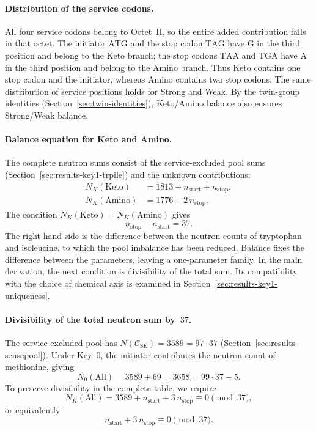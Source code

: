 \documentclass[11pt,a4paper]{article}
\renewcommand{\_}{\origunderscore\allowbreak}
\begin{document}
\paragraph{Distribution of the service codons.}
All four service codons belong to Octet~II, so the entire
added contribution falls in that octet.
The initiator $\mathrm{ATG}$ and the stop codon $\mathrm{TAG}$
have $\mathrm{G}$ in the third position and belong to the
Keto branch; the stop codons $\mathrm{TAA}$ and
$\mathrm{TGA}$ have $\mathrm{A}$ in the third position and
belong to the Amino branch. Thus Keto contains one stop
codon and the initiator, whereas Amino contains two stop
codons. The same distribution of service positions holds
for Strong and Weak. By the twin-group identities
(Section~\ref{sec:twin-identities}), Keto/Amino balance also
ensures Strong/Weak balance.

\paragraph{Balance equation for Keto and Amino.}
The complete neutron sums consist of the service-excluded
pool sums (Section~\ref{sec:results-key1-trpile})
and the unknown contributions:
\begin{align*}
N_K(\mathrm{Keto}) &= 1813 + n_{\text{start}} + n_{\text{stop}}, \\
N_K(\mathrm{Amino}) &= 1776 + 2\,n_{\text{stop}}.
\end{align*}
The condition $N_K(\mathrm{Keto})=N_K(\mathrm{Amino})$ gives
\[
n_{\text{stop}}-n_{\text{start}}=37.
\]
The right-hand side is the difference between the neutron
counts of tryptophan and isoleucine, to which the pool imbalance
has been reduced. Balance fixes the difference between the
parameters, leaving a one-parameter family. In the main
derivation, the next condition is divisibility of the total sum.
Its compatibility with the choice of chemical axis is examined
in Section~\ref{sec:results-key1-uniqueness}.

\paragraph{Divisibility of the total neutron sum by~$37$.}
The service-excluded pool has
$N(\mathcal{C}_{\mathrm{SE}})=3589=97\cdot37$
(Section~\ref{sec:results-sensepool}). Under Key~0, the
initiator contributes the neutron count of methionine, giving
\[
N_0(\mathrm{All})=3589+69=3658=99\cdot37-5.
\]
To preserve divisibility in the complete table, we require
\[
N_K(\mathrm{All})=
3589+n_{\text{start}}+3\,n_{\text{stop}}
\equiv0\pmod{37},
\]
or equivalently
\[
n_{\text{start}}+3\,n_{\text{stop}}\equiv0\pmod{37}.
\]
\end{document}
